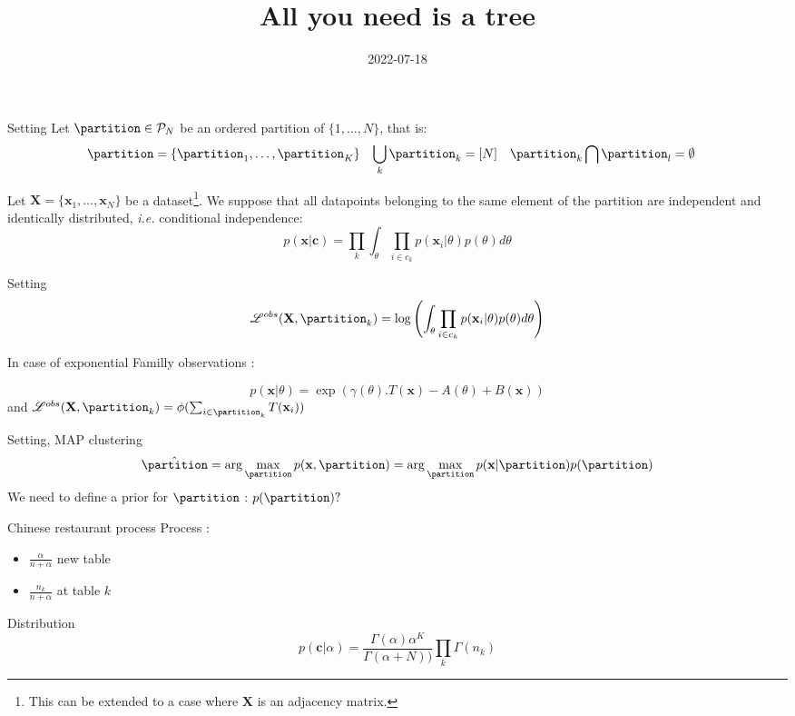 \documentclass[
  ignorenonframetext,
]{beamer}
\title{All you need is a tree}
\author{}
\date{\vspace{-2.5em}2022-07-18}
\newcommand{\bx}{\mathbf{x}}
\newcommand{\lobs}{\mathscr{L}^{obs}}
\begin{document}
\frame{\titlepage}

\begin{frame}{Setting}
\protect\hypertarget{setting}{}
Let \(\partition \in \mathcal{P}_N\) be an ordered partition of
\(\{1,\hdots,N\}\), that is: \begin{align}
    \partition = \left\{ \partition_1, \ldots, \partition_K \right\} & & \bigcup_k \partition_k = [N] & & \partition_k \bigcap \partition_l = \emptyset & & 
\end{align}

Let \(\mathbf{X} = \{\mathbf{x}_1,\hdots,\mathbf{x}_N\}\) be a
dataset\footnote{This can be extended to a case where $\mathbf{X}$ is an adjacency matrix.}.
We suppose that all datapoints belonging to the same element of the
partition are independent and identically distributed, \textit{i.e.}
conditional independence:
\[p(\mathbf{x}|\mathbf{c})=\prod_k \int_\theta \prod_{i \in c_k}p(\mathbf{x}_i|\theta)p(\theta)d\theta\]
\end{frame}

\begin{frame}{Setting}
\protect\hypertarget{setting-1}{}
\[\lobs(\mathbf{X},\partition_k)=\log\left(\int_\theta \prod_{i \in c_k}p(\mathbf{x}_i|\theta)p(\theta)d\theta\right)\]

In case of exponential Familly observations :

\[p(\bx|\theta)=\exp\left(\gamma(\theta).T(\bx)-A(\theta)+B(\bx)\right)\]
and
\(\lobs(\mathbf{X},\partition_k)=\phi(\sum_{i\in\partition_k}T(\bx_i))\)
\end{frame}

\begin{frame}{Setting, MAP clustering}
\protect\hypertarget{setting-map-clustering}{}
\[\hat{\partition}=\arg\max_{\partition}p(\mathbf{x},\partition)=\arg\max_{\partition}p(\mathbf{x}|\partition)p(\partition)\]
We need to define a prior for \(\partition\) : \(p(\partition)?\)
\end{frame}

\begin{frame}{Chinese restaurant process}
\protect\hypertarget{chinese-restaurant-process}{}
Process :

\begin{itemize}
    \item $\frac{\alpha}{n+\alpha}$ new table
    \item $\frac{n_k}{n+\alpha}$ at table $k$ 
\end{itemize}

Distribution
\[p(\mathbf{c}|\alpha)=\frac{\Gamma(\alpha)\alpha^{K}}{\Gamma(\alpha+N))}\prod_{k}\Gamma(n_k)\]
\end{frame}
\end{document}
